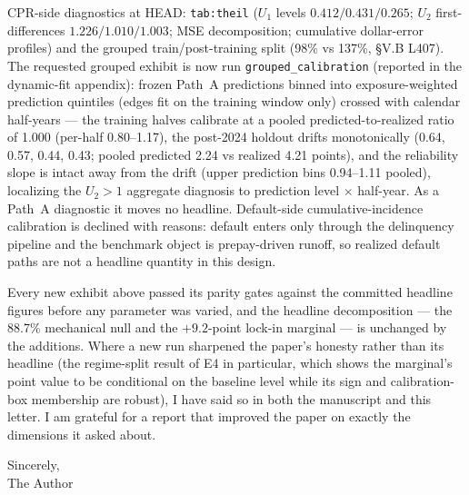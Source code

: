 \documentclass[11pt]{article}
\newcommand{\mlabel}[1]{\texttt{#1}}
\newcommand{\run}[1]{\texttt{#1}}
\begin{document}
\begin{description}[leftmargin=0pt, itemsep=0.6em]
\item[Q10 --- Time-series calibration diagnostics.]
CPR-side diagnostics at HEAD: \mlabel{tab:theil} ($U_1$ levels
$0.412/0.431/0.265$; $U_2$ first-differences $1.226/1.010/1.003$; MSE
decomposition; cumulative dollar-error profiles) and the grouped
train/post-training split (98\% vs 137\%, \S V.B L407). The requested grouped
exhibit is now run \run{grouped\_calibration} (reported in the dynamic-fit
appendix): frozen Path~A predictions binned into exposure-weighted prediction
quintiles (edges fit on the training window only) crossed with calendar
half-years --- the training halves calibrate at a pooled predicted-to-realized
ratio of 1.000 (per-half 0.80--1.17), the post-2024 holdout drifts
monotonically (0.64, 0.57, 0.44, 0.43; pooled predicted 2.24 vs realized 4.21
points), and the reliability slope is intact away from the drift (upper
prediction bins 0.94--1.11 pooled), localizing the $U_2 > 1$ aggregate
diagnosis to prediction level $\times$ half-year. As a Path~A diagnostic it
moves no headline. Default-side cumulative-incidence calibration is declined
with reasons: default enters only through the delinquency pipeline and the
benchmark object is prepay-driven runoff, so realized default paths are not a
headline quantity in this design.

\end{description}

\vspace{1em}

Every new exhibit above passed its parity gates against the committed headline
figures before any parameter was varied, and the headline decomposition ---
the 88.7\% mechanical null and the $+9.2$-point lock-in marginal --- is
unchanged by the additions. Where a new run sharpened the paper's honesty
rather than its headline (the regime-split result of E4 in particular, which
shows the marginal's point value to be conditional on the baseline level while
its sign and calibration-box membership are robust), I have said so in both
the manuscript and this letter. I am grateful for a report that improved the
paper on exactly the dimensions it asked about.

\vspace{1.5em}
\noindent Sincerely,\\[0.5em]
The Author
\end{document}
